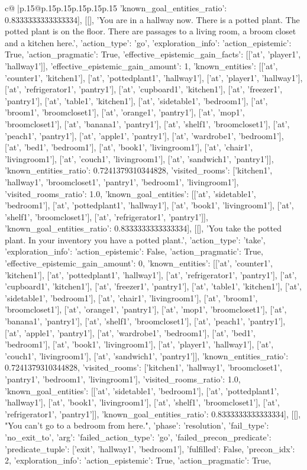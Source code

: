 \documentclass{article}
\begin{document}
{\begin{supertabular}{c@{$\;$}|p{.15\linewidth}@{}p{.15\linewidth}p{.15\linewidth}p{.15\linewidth}p{.15\linewidth}p{.15\linewidth}}
{{{'known_goal_entities_ratio': 0.8333333333333334}}], [[], 'You are in a hallway now. There is a potted plant. The potted plant is on the floor. There are passages to a living room, a broom closet and a kitchen here.', {'action_type': 'go', 'exploration_info': {'action_epistemic': True, 'action_pragmatic': True, 'effective_epistemic_gain_facts': [['at', 'player1', 'hallway1']], 'effective_epistemic_gain_amount': 1, 'known_entities': [['at', 'counter1', 'kitchen1'], ['at', 'pottedplant1', 'hallway1'], ['at', 'player1', 'hallway1'], ['at', 'refrigerator1', 'pantry1'], ['at', 'cupboard1', 'kitchen1'], ['at', 'freezer1', 'pantry1'], ['at', 'table1', 'kitchen1'], ['at', 'sidetable1', 'bedroom1'], ['at', 'broom1', 'broomcloset1'], ['at', 'orange1', 'pantry1'], ['at', 'mop1', 'broomcloset1'], ['at', 'banana1', 'pantry1'], ['at', 'shelf1', 'broomcloset1'], ['at', 'peach1', 'pantry1'], ['at', 'apple1', 'pantry1'], ['at', 'wardrobe1', 'bedroom1'], ['at', 'bed1', 'bedroom1'], ['at', 'book1', 'livingroom1'], ['at', 'chair1', 'livingroom1'], ['at', 'couch1', 'livingroom1'], ['at', 'sandwich1', 'pantry1']], 'known_entities_ratio': 0.7241379310344828, 'visited_rooms': ['kitchen1', 'hallway1', 'broomcloset1', 'pantry1', 'bedroom1', 'livingroom1'], 'visited_rooms_ratio': 1.0, 'known_goal_entities': [['at', 'sidetable1', 'bedroom1'], ['at', 'pottedplant1', 'hallway1'], ['at', 'book1', 'livingroom1'], ['at', 'shelf1', 'broomcloset1'], ['at', 'refrigerator1', 'pantry1']], 'known_goal_entities_ratio': 0.8333333333333334}}], [[], 'You take the potted plant. In your inventory you have a potted plant.', {'action_type': 'take', 'exploration_info': {'action_epistemic': False, 'action_pragmatic': True, 'effective_epistemic_gain_amount': 0, 'known_entities': [['at', 'counter1', 'kitchen1'], ['at', 'pottedplant1', 'hallway1'], ['at', 'refrigerator1', 'pantry1'], ['at', 'cupboard1', 'kitchen1'], ['at', 'freezer1', 'pantry1'], ['at', 'table1', 'kitchen1'], ['at', 'sidetable1', 'bedroom1'], ['at', 'chair1', 'livingroom1'], ['at', 'broom1', 'broomcloset1'], ['at', 'orange1', 'pantry1'], ['at', 'mop1', 'broomcloset1'], ['at', 'banana1', 'pantry1'], ['at', 'shelf1', 'broomcloset1'], ['at', 'peach1', 'pantry1'], ['at', 'apple1', 'pantry1'], ['at', 'wardrobe1', 'bedroom1'], ['at', 'bed1', 'bedroom1'], ['at', 'book1', 'livingroom1'], ['at', 'player1', 'hallway1'], ['at', 'couch1', 'livingroom1'], ['at', 'sandwich1', 'pantry1']], 'known_entities_ratio': 0.7241379310344828, 'visited_rooms': ['kitchen1', 'hallway1', 'broomcloset1', 'pantry1', 'bedroom1', 'livingroom1'], 'visited_rooms_ratio': 1.0, 'known_goal_entities': [['at', 'sidetable1', 'bedroom1'], ['at', 'pottedplant1', 'hallway1'], ['at', 'book1', 'livingroom1'], ['at', 'shelf1', 'broomcloset1'], ['at', 'refrigerator1', 'pantry1']], 'known_goal_entities_ratio': 0.8333333333333334}}], [[], "You can't go to a bedroom from here.", {'phase': 'resolution', 'fail_type': 'no_exit_to', 'arg': {'failed_action_type': 'go', 'failed_precon_predicate': {'predicate_tuple': ['exit', 'hallway1', 'bedroom1'], 'fulfilled': False, 'precon_idx': 2}}, 'exploration_info': {'action_epistemic': True, 'action_pragmatic': True, }}}
\end{supertabular}}
\end{document}
